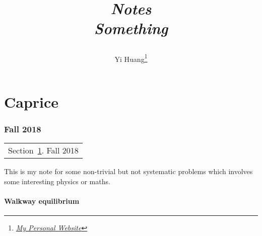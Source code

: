 \documentclass[10pt]{article}
\title{\begin{center}{\Huge \textit{Notes}}\\{{\itshape Something}}\end{center}}
\author{Yi Huang\footnote{\href{https://yiihuang.com/}{\textit{My Personal Website}}}}
\affiliation{
University of Minnesota
}
\begin{document}
	\maketitle
	\flushbottom
	\newpage
	\pagestyle{fancynotes}
	\part{Caprice}
	\section{Fall 2018}\label{sec:fall2018}
	\begin{margintable}\vspace{.8in}\footnotesize
		\begin{tabularx}{\marginparwidth}{|X}
		Section~\ref{sec:fall2018}. Fall 2018\\
		\end{tabularx}
	\end{margintable}

	This is my note for some non-trivial but not systematic problems which involves some interesting physics or maths.

	\subsection{Walkway equilibrium}
\end{document}
